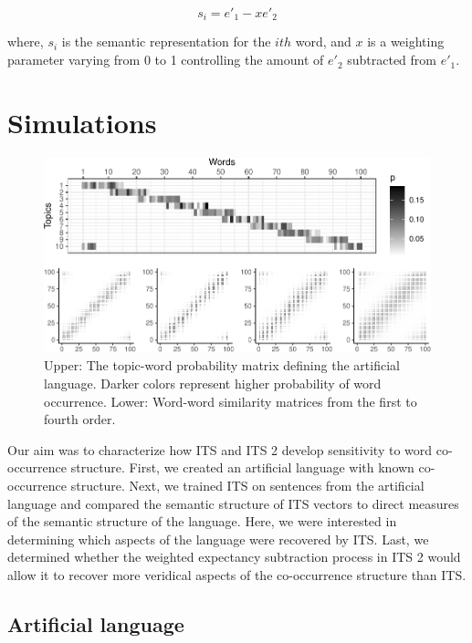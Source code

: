 \documentclass[10pt,letterpaper]{article}
\begin{document}
\begin{equation}
s_i = e'_1 - xe'_2
\label{eq:ITS2retrieval}
\end{equation}

where, \(s_i\) is the semantic representation for the \(ith\) word, and \(x\) is a weighting parameter varying from 0 to 1 controlling the amount of \(e'_2\) subtracted from \(e'_1\).

\section{Simulations}

\begin{figure}

\includegraphics[width=\textwidth]{ITS_cogsci_files/figure-latex/artlang-1.pdf}

\caption{Upper: The topic-word probability matrix defining the artificial language. Darker colors represent higher probability of word occurrence. Lower: Word-word similarity matrices from the first to fourth order.}\label{fig:artlang}
\end{figure}

Our aim was to characterize how ITS and ITS 2 develop sensitivity to word co-occurrence structure. First, we created an artificial language with known co-occurrence structure. Next, we trained ITS on sentences from the artificial language and compared the semantic structure of ITS vectors to direct measures of the semantic structure of the language. Here, we were interested in determining which aspects of the language were recovered by ITS. Last, we determined whether the weighted expectancy subtraction process in ITS 2 would allow it to recover more veridical aspects of the co-occurrence structure than ITS.

\subsection{Artificial language}
\end{document}
